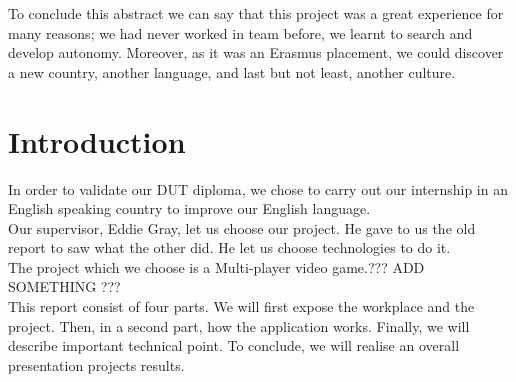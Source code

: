 \documentclass{scrreprt}
\begin{document}
		  To conclude this abstract we can say that this project was a great experience for many
		  reasons; we had never worked in team before, we learnt to search and develop
		  autonomy. Moreover, as it was an Erasmus placement, we could discover a new country,
		  another language, and last but not least, another culture.

		  \chapter*{Introduction} %
		  In order to validate our DUT diploma, we chose to carry out our internship in an
		  English speaking country to improve our English language.\\


		  Our supervisor, Eddie Gray, let us choose our project. He gave to us the old report to saw what the other did. He let us choose technologies to do it.\\

		  The project which we choose is a Multi-player video game.??? ADD SOMETHING ???\\


		  This report consist of four parts. We will first expose the workplace and the project. Then, in a second part, how the application works. Finally, we will describe important technical point.
		  To conclude, we will realise an overall presentation projects results.\\
	
\end{document}
